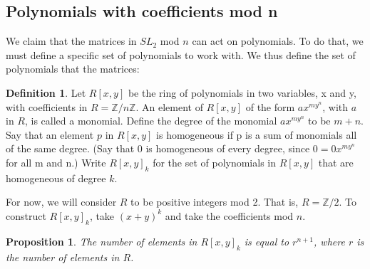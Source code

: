 \documentclass[a4paper,draft]{amsproc}
\theoremstyle{plain}
\newtheorem{prop}{Proposition}[section]
\theoremstyle{definition}
\newtheorem{dfn}{Definition}[section]
\theoremstyle{remark}
\numberwithin{equation}{section}
\begin{document}
\subsection{Polynomials with coefficients mod n}
We claim that the matrices in $SL_{2}$ mod $n$ can act on polynomials. To do that, we must define a specific set of polynomials to work with. 
We thus define the set of polynomials that the matrices: 
\begin{dfn}
Let $R[x,y]$ be the ring of polynomials in two variables, x and y, with coefficients in $R = \mathbb{Z}/n\mathbb{Z}$. An element of $R[x,y]$ of the form  $ax^{my^{n}}$, with $a$ in $R$, is called a monomial. Define the degree of the monomial $ax^{my^{n}}$ to be $m+n$. Say that an element $p$ in $R[x,y]$ is homogeneous if p is a sum of monomials all of the same degree. (Say that 0 is homogeneous of every degree, since $0=0x^{my^{n}}$ for all m and n.) Write $R[x,y]_{k}$ for the set of polynomials in $R[x,y]$ that are homogeneous of degree $k$.
\end{dfn}
For now, we will consider $R$ to be positive integers mod 2. That is, $R = \mathbb{Z}/2$. To construct $R[x,y]_{k}$, take $(x+y)^{k}$ and take the coefficients mod $n$.

\begin{prop}The number of elements in $R[x,y]_{k}$ is equal to $r^{n + 1}$, where $r$ is the number of elements in $R$. 
\end{prop}
\end{document}
